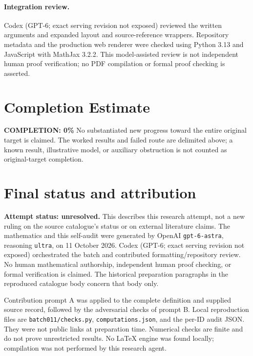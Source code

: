\documentclass[11pt]{article}
\begin{document}
\paragraph{Integration review.} Codex (GPT-6; exact serving revision not exposed) reviewed the written arguments and expanded layout and source-reference wrappers. Repository metadata and the production web renderer were checked using Python 3.13 and JavaScript with MathJax 3.2.2. This model-assisted review is not independent human proof verification; no PDF compilation or formal proof checking is asserted.

\section{Completion Estimate}
\noindent\textbf{COMPLETION: 0\%}
No substantiated new progress toward the entire original target is claimed. The worked results and failed route are delimited above; a known result, illustrative model, or auxiliary obstruction is not counted as original-target completion.

\section{Final status and attribution}
\textbf{Attempt status: unresolved.} This describes this research attempt, not a new ruling on the source catalogue's status or on external literature claims.
The mathematics and this self-audit were generated by OpenAI \texttt{gpt-6-astra}, reasoning \texttt{ultra}, on 11 October 2026. Codex (GPT-6; exact serving revision not exposed) orchestrated the batch and contributed formatting/repository review. No human mathematical authorship, independent human proof checking, or formal verification is claimed. The historical preparation paragraphs in the reproduced catalogue body concern that body only.

Contribution prompt A was applied to the complete definition and supplied source record, followed by the adversarial checks of prompt B. Local reproduction files are \texttt{batch011/checks.py}, \texttt{computations.json}, and the per-ID audit JSON. They were not public links at preparation time. Numerical checks are finite and do not prove unrestricted results. No LaTeX engine was found locally; compilation was not performed by this research agent.
\end{document}
